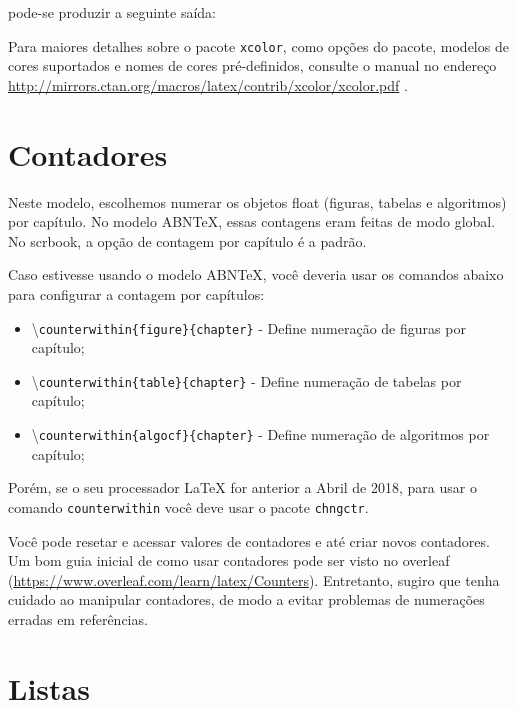 \noindent pode-se produzir a seguinte saída:


Para maiores detalhes sobre o pacote \texttt{xcolor}, como opções do pacote, modelos de cores suportados e nomes de cores pré-definidos, consulte o manual no endereço \url{http://mirrors.ctan.org/macros/latex/contrib/xcolor/xcolor.pdf} \parencite{xcolor}.

\section{Contadores}

Neste modelo, escolhemos numerar os objetos float (figuras, tabelas e algoritmos) por capítulo. No modelo ABN\TeX{}, essas contagens eram feitas de modo global. No \gls{scrbook}, a opção de contagem por capítulo é a padrão. 

Caso estivesse usando o modelo ABN\TeX{}, você deveria usar os comandos abaixo para configurar a contagem por capítulos:

\begin{itemize}
	\item 
	\textbackslash \texttt{counterwithin\{figure\}\{chapter\}} - Define numeração de figuras por capítulo;
    \item \textbackslash \texttt{counterwithin\{table\}\{chapter\}} - Define numeração de tabelas por capítulo;
    \item \textbackslash \texttt{counterwithin\{algocf\}\{chapter\}} - Define numeração de algoritmos por capítulo;
\end{itemize}

Porém, se o seu processador \LaTeX{} for anterior a Abril de 2018, para usar o comando \texttt{counterwithin} você deve usar o pacote \texttt{chngctr}.

Você pode resetar e acessar valores de contadores e até criar novos contadores. Um bom guia inicial de como usar contadores pode ser visto no \gls{overleaf} (\url{https://www.overleaf.com/learn/latex/Counters}). Entretanto, sugiro que tenha cuidado ao manipular contadores, de modo a evitar problemas de numerações erradas em referências.

\section{Listas}

